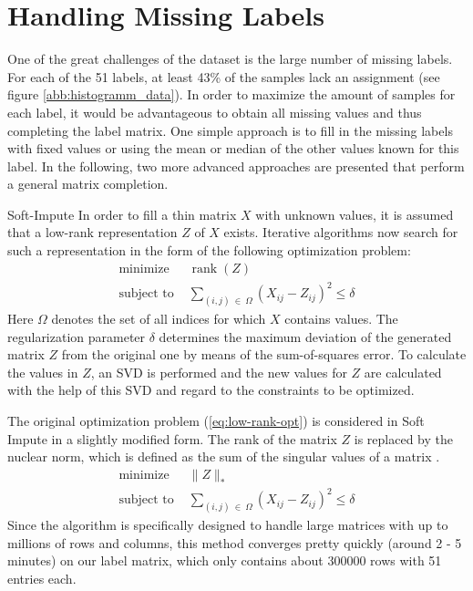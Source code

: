 \section{Handling Missing Labels}
One of the great challenges of the dataset is the large number of missing labels. For each of the 51 labels, at least 43\% of the samples lack an assignment (see figure \ref{abb:histogramm_data}). In order to maximize the amount of samples for each label, it would be advantageous to obtain all missing values and thus completing the label matrix. One simple approach is to fill in the missing labels with fixed values or using the mean or median of the other values known for this label. In the following, two more advanced approaches are presented that perform a general matrix completion.

\begin{subsection}{Soft-Impute}
	In order to fill a thin matrix $X$ with unknown values, it is assumed that a low-rank representation $Z$ of $X$ exists. Iterative algorithms now search for such a representation in the form of the following optimization problem:
	\begin{equation} \label{eq:low-rank-opt}
		\begin{split}
			\text{minimize } &\operatorname{rank}(Z) \\
			\text{subject to } &\sum_{(i,j)\:\in\: \Omega} (X_{ij} - Z_{ij})^2 \leq \delta
		\end{split}	
	\end{equation}
	Here $\Omega$ denotes the set of all indices for which $X$ contains values. The regularization parameter $\delta$ determines the maximum deviation of the generated matrix $Z$ from the original one by means of the sum-of-squares error. To calculate the values in $Z$, an SVD is performed and the new values for $Z$ are calculated with the help of this SVD and regard to the constraints to be optimized.\par
	The original optimization problem (\ref{eq:low-rank-opt}) is considered in Soft Impute in a slightly modified form. The rank of the matrix $Z$ is replaced by the nuclear norm, which is defined as the sum of the singular values of a matrix \cite{mazumder2010spectral}.
	\begin{equation} \label{eq:low-rank-soft-opt}
	\begin{split}
	\text{minimize } & \| Z \|_* \\
	\text{subject to } &\sum_{(i,j)\:\in\: \Omega} (X_{ij} - Z_{ij})^2 \leq \delta
	\end{split}
	\end{equation}
	Since the algorithm is specifically designed to handle large matrices with up to millions of rows and columns, this method converges pretty quickly (around 2 - 5 minutes) on our label matrix, which only contains about 300000 rows with 51 entries each. 
\end{subsection}

